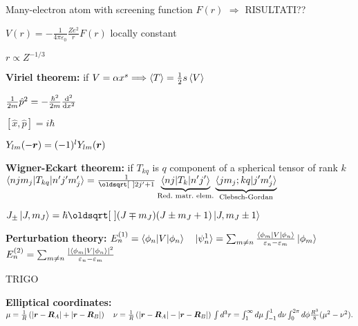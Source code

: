 Many-electron atom with screening function $F(r)$ $\Rightarrow$ RISULTATI??
\begin{squishlist}
    \item $V(r) = -\frac{1}{4 \pi \varepsilon_0} \frac{Z e^2}{r} F(r)$ locally constant
    \item $r \propto Z^{-1/3}$
\end{squishlist}


\begin{squishlist}
    \item \textbf{Viriel theorem:} if $V = \alpha x^s \Longrightarrow \braket{T} = \frac{1}{2}s \braket{V}$
    \item $\frac{1}{2m}\hat{p}^2 = - \frac{\hbar^2}{2m} \dder{x}{}$
    \item $[\hat{x}, \hat{p}] = i \hbar$
    \item $Y_{lm}(-\vr) = (-1)^l Y_{lm}(\vr)$
    \item \textbf{Wigner-Eckart theorem:} if $T_{kq}$ is $q$ component of a spherical tensor of rank $k$ \\
    $\braket{n j m_j | T_{kq} | n' j' m_j'} = \frac{1}{\sqrt{2j'+1}} \underbrace{\braket{n j | T_k | n'j'}}_{\text{Red.\ matr.\ elem.}} \underbrace{\braket{j m_j ; k q | j' m_j'}}_{\text{Clebsch-Gordan}}$

    \item $J_{\pm} \ket{J,m_J} = \hbar \sqrt{(J \mp m_J)(J \pm m_J + 1)} \ket{J,m_J \pm 1 }$
    \item \textbf{Perturbation theory:} $E_n^{(1)}=\braket{\phi_n|V|\phi_n} \quad \ket{\psi^1_n} = \sum_{m\neq n}\frac{\braket{\phi_m|V|\phi_n}}{\varepsilon_n - \varepsilon_m} \ket{\phi_m}$ \\
    $E_n^{(2)} = \sum_{m\neq n}\frac{|\braket{\phi_m|V|\phi_n}|^2}{\varepsilon_n - \varepsilon_m}$
    \item TRIGO
    \item \textbf{Elliptical coordinates:} $\mu = \frac{1}{R} \left(|\vec{r}-\vec{R}_A| + | \vec{r} - \vec{R}_B| \right) \quad 
    \nu = \frac{1}{R} \left(|\vec{r}-\vec{R}_A| - | \vec{r} - \vec{R}_B| \right) \\
    \int d^3r = \int_1^\infty d\mu \int_{-1}^1 d \nu \int_0^{2\pi} d \phi \frac{R^3}{8} ( \mu^2 - \nu^2).$
\end{squishlist}